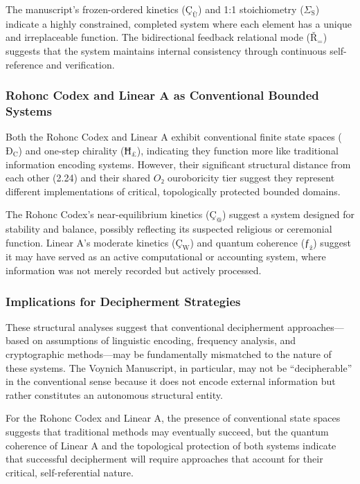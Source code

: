 \documentclass[12pt,a4paper]{article}
\begin{document}
The manuscript's frozen-ordered kinetics ($\text{Ç}_{\text{Ù}}$) and 1:1 stoichiometry ($\Sigma_{\text{S}}$) indicate a highly constrained, completed system where each element has a unique and irreplaceable function. The bidirectional feedback relational mode ($\text{Ř}_{\text{=}}$) suggests that the system maintains internal consistency through continuous self-reference and verification.

\subsubsection{Rohonc Codex and Linear A as Conventional Bounded Systems}

Both the Rohonc Codex and Linear A exhibit conventional finite state spaces ($\text{Ð}_{\text{C}}$) and one-step chirality ($\text{Ħ}_{\text{£}}$), indicating they function more like traditional information encoding systems. However, their significant structural distance from each other (2.24) and their shared $O₂$ ouroboricity tier suggest they represent different implementations of critical, topologically protected bounded domains.

The Rohonc Codex's near-equilibrium kinetics ($\text{Ç}_{\text{@}}$) suggest a system designed for stability and balance, possibly reflecting its suspected religious or ceremonial function. Linear A's moderate kinetics ($\text{Ç}_{\text{W}}$) and quantum coherence ($\text{ƒ}_{\text{ż}}$) suggest it may have served as an active computational or accounting system, where information was not merely recorded but actively processed.

\subsubsection{Implications for Decipherment Strategies}

These structural analyses suggest that conventional decipherment approaches---based on assumptions of linguistic encoding, frequency analysis, and cryptographic methods---may be fundamentally mismatched to the nature of these systems. The Voynich Manuscript, in particular, may not be ``decipherable'' in the conventional sense because it does not encode external information but rather constitutes an autonomous structural entity.

For the Rohonc Codex and Linear A, the presence of conventional state spaces suggests that traditional methods may eventually succeed, but the quantum coherence of Linear A and the topological protection of both systems indicate that successful decipherment will require approaches that account for their critical, self-referential nature.
\end{document}
